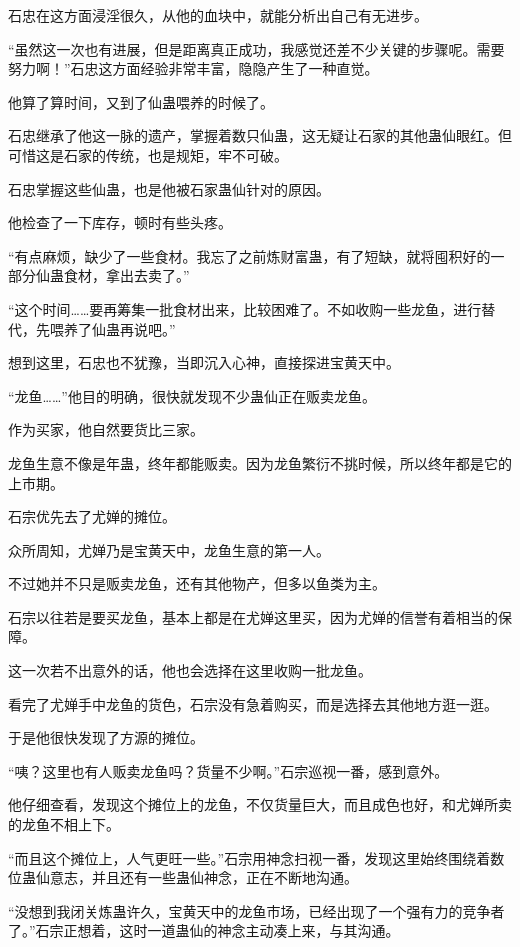 
\begin{this_body}

石忠在这方面浸淫很久，从他的血块中，就能分析出自己有无进步。

“虽然这一次也有进展，但是距离真正成功，我感觉还差不少关键的步骤呢。需要努力啊！”石忠这方面经验非常丰富，隐隐产生了一种直觉。

他算了算时间，又到了仙蛊喂养的时候了。

石忠继承了他这一脉的遗产，掌握着数只仙蛊，这无疑让石家的其他蛊仙眼红。但可惜这是石家的传统，也是规矩，牢不可破。

石忠掌握这些仙蛊，也是他被石家蛊仙针对的原因。

他检查了一下库存，顿时有些头疼。

“有点麻烦，缺少了一些食材。我忘了之前炼财富蛊，有了短缺，就将囤积好的一部分仙蛊食材，拿出去卖了。”

“这个时间……要再筹集一批食材出来，比较困难了。不如收购一些龙鱼，进行替代，先喂养了仙蛊再说吧。”

想到这里，石忠也不犹豫，当即沉入心神，直接探进宝黄天中。

“龙鱼……”他目的明确，很快就发现不少蛊仙正在贩卖龙鱼。

作为买家，他自然要货比三家。

龙鱼生意不像是年蛊，终年都能贩卖。因为龙鱼繁衍不挑时候，所以终年都是它的上市期。

石宗优先去了尤婵的摊位。

众所周知，尤婵乃是宝黄天中，龙鱼生意的第一人。

不过她并不只是贩卖龙鱼，还有其他物产，但多以鱼类为主。

石宗以往若是要买龙鱼，基本上都是在尤婵这里买，因为尤婵的信誉有着相当的保障。

这一次若不出意外的话，他也会选择在这里收购一批龙鱼。

看完了尤婵手中龙鱼的货色，石宗没有急着购买，而是选择去其他地方逛一逛。

于是他很快发现了方源的摊位。

“咦？这里也有人贩卖龙鱼吗？货量不少啊。”石宗巡视一番，感到意外。

他仔细查看，发现这个摊位上的龙鱼，不仅货量巨大，而且成色也好，和尤婵所卖的龙鱼不相上下。

“而且这个摊位上，人气更旺一些。”石宗用神念扫视一番，发现这里始终围绕着数位蛊仙意志，并且还有一些蛊仙神念，正在不断地沟通。

“没想到我闭关炼蛊许久，宝黄天中的龙鱼市场，已经出现了一个强有力的竞争者了。”石宗正想着，这时一道蛊仙的神念主动凑上来，与其沟通。


\end{this_body}
